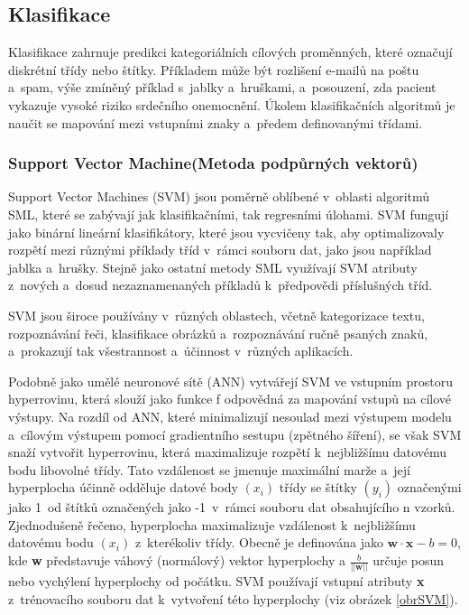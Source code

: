 \subsection{Klasifikace}
Klasifikace zahrnuje predikci kategoriálních cílových proměnných, které označují diskrétní třídy nebo štítky. Příkladem může být rozlišení e-mailů na poštu a~spam, výše zmíněný příklad s~jablky a~hruškami, a~posouzení, zda pacient vykazuje vysoké riziko srdečního onemocnění. Úkolem klasifikačních algoritmů je naučit se mapování mezi vstupními znaky a~předem definovanými třídami.

\subsubsection{Support Vector Machine(Metoda podpůrných vektorů)}
Support Vector Machines (SVM)\cite{Steinwart2008} jsou poměrně oblíbené v~oblasti algoritmů SML, které se zabývají jak klasifikačními, tak regresními úlohami. SVM fungují jako binární lineární klasifikátory, které jsou vycvičeny tak, aby optimalizovaly rozpětí mezi různými příklady tříd v~rámci souboru dat, jako jsou například jablka a~hrušky. Stejně jako ostatní metody SML využívají SVM atributy z~nových a~dosud nezaznamenaných příkladů k~předpovědi příslušných tříd.

\newpage

SVM jsou široce používány v~různých oblastech, včetně kategorizace textu, rozpoznávání řeči, klasifikace obrázků a~rozpoznávání ručně psaných znaků, a~prokazují tak všestrannost a~účinnost v~různých aplikacích.

Podobně jako umělé neuronové sítě (ANN) vytvářejí SVM ve vstupním prostoru hyperrovinu, která slouží jako funkce f odpovědná za mapování vstupů na cílové výstupy. Na rozdíl od ANN, které minimalizují nesoulad mezi výstupem modelu a~cílovým výstupem pomocí gradientního sestupu (zpětného šíření), se však SVM snaží vytvořit hyperrovinu, která maximalizuje rozpětí k~nejbližšímu datovému bodu libovolné třídy. Tato vzdálenost se jmenuje maximální marže a~její hyperplocha účinně odděluje datové body \((x_i)\) třídy se štítky \((y_i)\) označenými jako 1~od štítků označených jako -1~v~rámci souboru dat obsahujícího n vzorků. Zjednodušeně řečeno, hyperplocha maximalizuje vzdálenost k~nejbližšímu datovému bodu \((x_i)\) z~kterékoliv třídy. Obecně je definována jako \(\textbf{w}\cdot{\textbf{x}} - b = 0\), kde \textbf{w} představuje váhový (normálový) vektor hyperplochy a \(\frac{b}{||\textbf{w}||}\) určuje posun nebo vychýlení hyperplochy od počátku. SVM používají vstupní atributy \textbf{x} z~trénovacího souboru dat k~vytvoření této hyperplochy (viz obrázek \ref{obrSVM}).

